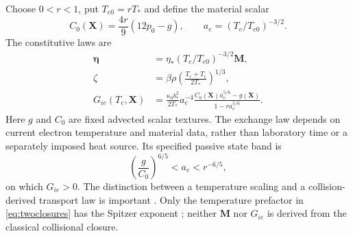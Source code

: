 \documentclass[11pt,a4paper]{article}
\theoremstyle{remark}\newtheorem{remark}{Remark}
\numberwithin{equation}{section}
\newcommand{\MM}{\boldsymbol M}
\newcommand{\XX}{\boldsymbol X}
\newcommand{\etab}{\boldsymbol\eta}
\begin{document}
Choose $0<r<1$, put $T_{e0}=rT_*$ and define the material scalar
\begin{equation}
C_0(\XX)=\frac{4r}{9}(12p_0-g),\qquad
a_e=(T_e/T_{e0})^{-3/2}.
\label{eq:Czero}
\end{equation}
The constitutive laws are
\begin{equation}
\begin{aligned}
\etab&=\eta_*(T_e/T_{e0})^{-3/2}\MM,\\
\zeta&=\beta\rho\left(\frac{T_e+T_i}{2T_*}\right)^{1/3},\\
G_{ie}(T_e,\XX)&=\frac{\kappa_0b_*^2}{2T_*}a_e^{-4}
\frac{C_0(\XX)a_e^{5/6}-g(\XX)}{1-r a_e^{5/6}}.
\end{aligned}
\label{eq:twoclosures}
\end{equation}
Here $g$ and $C_0$ are fixed advected scalar textures. The exchange law depends on current electron temperature and material data, rather than laboratory time or a separately imposed heat source. Its specified passive state band is
\begin{equation}
\left(\frac{g}{C_0}\right)^{6/5}<a_e<r^{-6/5},
\label{eq:exchangeband}
\end{equation}
on which $G_{ie}>0$. The distinction between a temperature scaling and a collision-derived transport law is important \citep{Spitzer,Braginskii1965,Lingam}. Only the temperature prefactor in \eqref{eq:twoclosures} has the Spitzer exponent \citep{Spitzer}; neither $\MM$ nor $G_{ie}$ is derived from the classical collisional closure.
\end{document}
